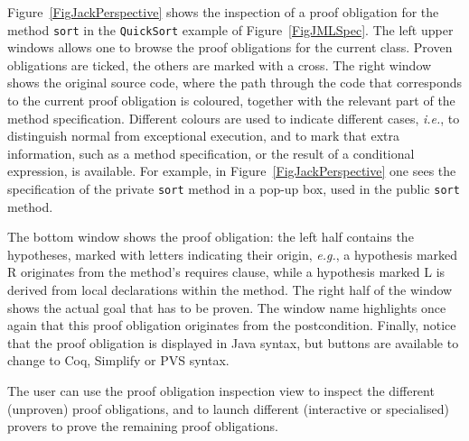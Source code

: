 Figure~\ref{FigJackPerspective} shows the inspection of a proof
obligation for the method \texttt{sort} in the \texttt{QuickSort}
example of Figure~\ref{FigJMLSpec}. The left upper windows allows one
to browse the proof obligations for the current class. Proven
obligations are ticked, the others are marked with a cross. The right
window shows the original source code, where the path through the code
that corresponds to the current proof obligation is coloured, together
with the relevant part of the method specification. Different colours
are used to indicate different cases, \emph{i.e.}, to distinguish
normal from exceptional execution, and to mark that extra information,
such as a method specification, or the result of a conditional
expression, is available. For example, in
Figure~\ref{FigJackPerspective} one sees the specification of the
private \texttt{sort} method in a pop-up box, used in the public
\texttt{sort} method.

The bottom window shows the proof obligation: the left half contains
the hypotheses, marked with letters indicating their origin,
\emph{e.g.}, a hypothesis marked R originates from the method's
requires clause, while a hypothesis marked L is derived from local
declarations within the method. The right half of the window shows the
actual goal that has to be proven. The window name highlights once
again that this proof obligation originates from the
postcondition. Finally, notice that the proof obligation is displayed
in Java syntax, but buttons are available to change to Coq, Simplify
or PVS syntax.


The user can use the proof obligation inspection view to inspect the
different (unproven) proof obligations, and to launch different
(interactive or specialised) provers to prove the remaining proof
obligations.

